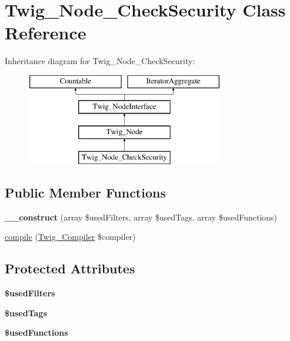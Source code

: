 \hypertarget{classTwig__Node__CheckSecurity}{}\section{Twig\+\_\+\+Node\+\_\+\+Check\+Security Class Reference}
\label{classTwig__Node__CheckSecurity}
Inheritance diagram for Twig\+\_\+\+Node\+\_\+\+Check\+Security\+:\begin{figure}[H]
\begin{center}
\leavevmode
\includegraphics[height=4.000000cm]{classTwig__Node__CheckSecurity}
\end{center}
\end{figure}
\subsection*{Public Member Functions}
\begin{DoxyCompactItemize}
\item 
{\bfseries \+\_\+\+\_\+construct} (array \$used\+Filters, array \$used\+Tags, array \$used\+Functions)\hypertarget{classTwig__Node__CheckSecurity_a7e74f01ef4fc055e64b42d000c954abc}{}\label{classTwig__Node__CheckSecurity_a7e74f01ef4fc055e64b42d000c954abc}

\item 
\hyperlink{classTwig__Node__CheckSecurity_a07e3a75cb6386db52f700654804db466}{compile} (\hyperlink{classTwig__Compiler}{Twig\+\_\+\+Compiler} \$compiler)
\end{DoxyCompactItemize}
\subsection*{Protected Attributes}
\begin{DoxyCompactItemize}
\item 
{\bfseries \$used\+Filters}\hypertarget{classTwig__Node__CheckSecurity_a5b540fb30ca027e6e284f93d825a6ebb}{}\label{classTwig__Node__CheckSecurity_a5b540fb30ca027e6e284f93d825a6ebb}

\item 
{\bfseries \$used\+Tags}\hypertarget{classTwig__Node__CheckSecurity_afc3dd42c4ab338896590094c3fb05d7f}{}\label{classTwig__Node__CheckSecurity_afc3dd42c4ab338896590094c3fb05d7f}

\item 
{\bfseries \$used\+Functions}\hypertarget{classTwig__Node__CheckSecurity_ac9e6f31f3aa21ad5343b1750d0349fa1}{}\label{classTwig__Node__CheckSecurity_ac9e6f31f3aa21ad5343b1750d0349fa1}

\end{DoxyCompactItemize}


